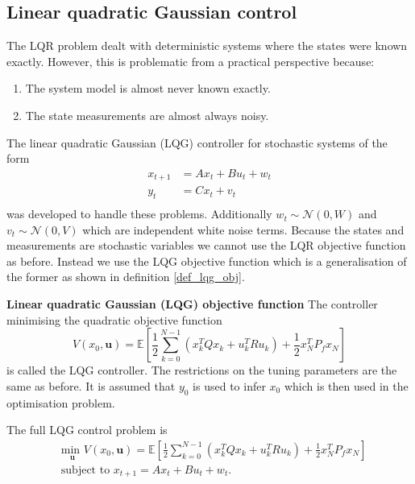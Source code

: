 \subsection{Linear quadratic Gaussian control}
\label{sec_lqg_lit}
The LQR problem dealt with deterministic systems where the states were known exactly. However, this is problematic from a practical perspective because:
\begin{enumerate}
\item
The system model is almost never known exactly.
\item
The state measurements are almost always noisy.
\end{enumerate}
The linear quadratic Gaussian (LQG) controller for stochastic systems of the form
\begin{equation}
\begin{aligned}
x_{t+1} &= Ax_t+ Bu_t + w_t \\
y_t &= Cx_t +v_t \\
\end{aligned}
\label{eq_lqg_ss}
\end{equation}
was developed to handle these problems. Additionally  $w_t \sim \mathcal{N}(0, W)$ and $v_t \sim \mathcal{N}(0, V)$ which are independent white noise terms. Because the states and measurements are stochastic variables we cannot use the LQR objective function as before. Instead we use the LQG objective function which is a generalisation of the former as shown in definition \ref{def_lqg_obj}.
\begin{defn}
\textbf{Linear quadratic Gaussian (LQG) objective function} The controller minimising the quadratic objective function 
\begin{equation}
V(x_0, \mathbf{u}) = \mathbb{E}\left[ \frac{1}{2}\sum_{k=0}^{N-1} \left( x_k^TQx_k + u_k^TRu_k \right) + \frac{1}{2}x_N^TP_fx_N \right]
\label{eq_lqg_obj}
\end{equation}
is called the LQG controller. The restrictions on the tuning parameters are the same as before. It is assumed that $y_0$ is used to infer $x_0$ which is then used in the optimisation problem.
\label{def_lqg_obj}
\end{defn}
The full LQG control problem is 
\begin{equation}
\begin{aligned}
&\underset{\mathbf{u}}{\text{min }} V(x_0, \mathbf{u}) = \mathbb{E}\left[ \frac{1}{2}\sum_{k=0}^{N-1} \left( x_k^TQx_k + u_k^TRu_k \right) + \frac{1}{2}x_N^TP_fx_N \right] \\
& \text{subject to } x_{t+1}=Ax_t+Bu_t + w_t.
\end{aligned}
\label{eq_lqg_problem}
\end{equation}
